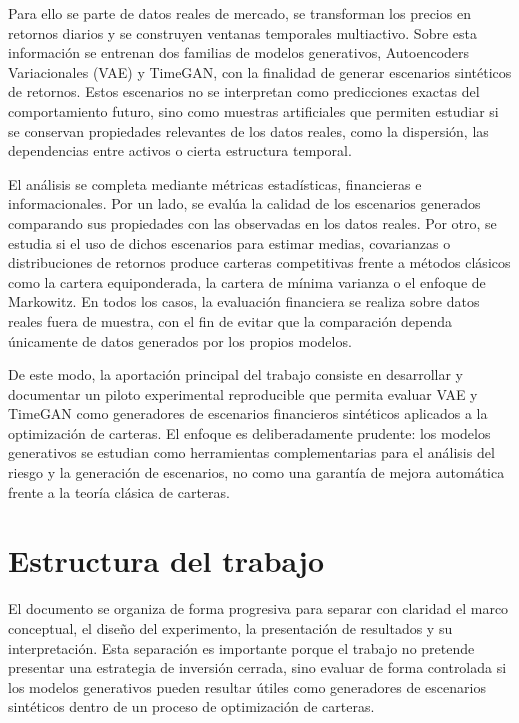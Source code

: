 \documentclass[11pt,a4paper,spanish,oneside]{book}
\numberwithin{equation}{chapter}
\numberwithin{figure}{chapter}
\begin{document}
Para ello se parte de datos reales de mercado, se transforman los precios en retornos diarios y se construyen ventanas temporales multiactivo. Sobre esta información se entrenan dos familias de modelos generativos, Autoencoders Variacionales (VAE) y TimeGAN, con la finalidad de generar escenarios sintéticos de retornos. Estos escenarios no se interpretan como predicciones exactas del comportamiento futuro, sino como muestras artificiales que permiten estudiar si se conservan propiedades relevantes de los datos reales, como la dispersión, las dependencias entre activos o cierta estructura temporal.

El análisis se completa mediante métricas estadísticas, financieras e informacionales. Por un lado, se evalúa la calidad de los escenarios generados comparando sus propiedades con las observadas en los datos reales. Por otro, se estudia si el uso de dichos escenarios para estimar medias, covarianzas o distribuciones de retornos produce carteras competitivas frente a métodos clásicos como la cartera equiponderada, la cartera de mínima varianza o el enfoque de Markowitz. En todos los casos, la evaluación financiera se realiza sobre datos reales fuera de muestra, con el fin de evitar que la comparación dependa únicamente de datos generados por los propios modelos.

De este modo, la aportación principal del trabajo consiste en desarrollar y documentar un piloto experimental reproducible que permita evaluar VAE y TimeGAN como generadores de escenarios financieros sintéticos aplicados a la optimización de carteras. El enfoque es deliberadamente prudente: los modelos generativos se estudian como herramientas complementarias para el análisis del riesgo y la generación de escenarios, no como una garantía de mejora automática frente a la teoría clásica de carteras.

\section{Estructura del trabajo}

El documento se organiza de forma progresiva para separar con claridad el marco conceptual, el diseño del experimento, la presentación de resultados y su interpretación. Esta separación es importante porque el trabajo no pretende presentar una estrategia de inversión cerrada, sino evaluar de forma controlada si los modelos generativos pueden resultar útiles como generadores de escenarios sintéticos dentro de un proceso de optimización de carteras.
\end{document}
